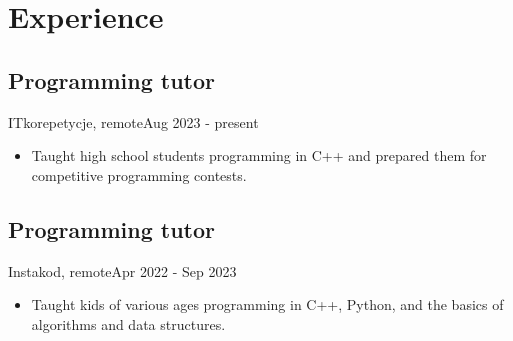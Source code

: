 \section{Experience}
\subsection{Programming tutor}{ITkorepetycje, remote}{Aug 2023 - present}
\begin{itemize}
    \item Taught high school students programming in C++ and prepared them for competitive programming contests. 
\end{itemize}
\subsection{Programming tutor}{Instakod, remote}{Apr 2022  - Sep 2023}
\begin{itemize}
    \item Taught kids of various ages programming in C++, Python, and the basics of algorithms and data structures.
\end{itemize}

\vspace{1em}
